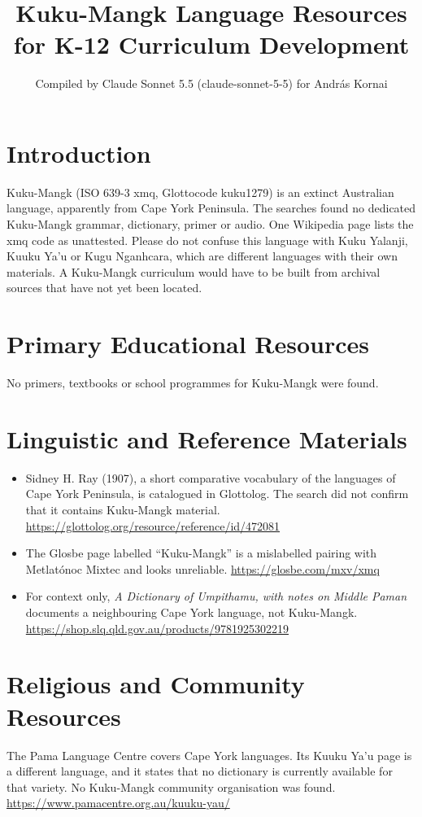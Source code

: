 \documentclass[12pt]{article}
\title{Kuku-Mangk Language Resources for K-12 Curriculum Development}
\author{Compiled by Claude Sonnet 5.5 (claude-sonnet-5-5) for Andr\'as Kornai}
\date{}
\begin{document}
\maketitle

\section{Introduction}
Kuku-Mangk (ISO 639-3 xmq, Glottocode kuku1279) is an extinct Australian language, apparently from Cape York Peninsula. The searches found no dedicated Kuku-Mangk grammar, dictionary, primer or audio. One Wikipedia page lists the xmq code as unattested. Please do not confuse this language with Kuku Yalanji, Kuuku Ya'u or Kugu Nganhcara, which are different languages with their own materials. A Kuku-Mangk curriculum would have to be built from archival sources that have not yet been located.

\section{Primary Educational Resources}
No primers, textbooks or school programmes for Kuku-Mangk were found.

\section{Linguistic and Reference Materials}
\begin{itemize}
\item Sidney H. Ray (1907), a short comparative vocabulary of the languages of Cape York Peninsula, is catalogued in Glottolog. The search did not confirm that it contains Kuku-Mangk material. \url{https://glottolog.org/resource/reference/id/472081}
\item The Glosbe page labelled ``Kuku-Mangk'' is a mislabelled pairing with Metlat\'onoc Mixtec and looks unreliable. \url{https://glosbe.com/mxv/xmq}
\item For context only, \emph{A Dictionary of Umpithamu, with notes on Middle Paman} documents a neighbouring Cape York language, not Kuku-Mangk. \url{https://shop.slq.qld.gov.au/products/9781925302219}
\end{itemize}

\section{Religious and Community Resources}
The Pama Language Centre covers Cape York languages. Its Kuuku Ya'u page is a different language, and it states that no dictionary is currently available for that variety. No Kuku-Mangk community organisation was found. \url{https://www.pamacentre.org.au/kuuku-yau/}
\end{document}
